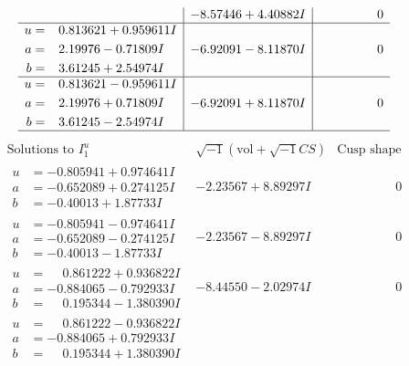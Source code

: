 \documentclass[1p]{elsarticle_modified}
\theoremstyle{definition}
\newcommand{\I}{\sqrt{-1}}
\begin{document}
$$\begin{array}{c|c|c}
 & -8.57446 + 4.40882 I & \phantom{-0.000000 } 0 \\ \hline\begin{aligned}
u &= \phantom{-}0.813621 + 0.959611 I \\
a &= \phantom{-}2.19976 - 0.71809 I \\
b &= \phantom{-}3.61245 + 2.54974 I\end{aligned}
 & -6.92091 - 8.11870 I & \phantom{-0.000000 } 0 \\ \hline\begin{aligned}
u &= \phantom{-}0.813621 - 0.959611 I \\
a &= \phantom{-}2.19976 + 0.71809 I \\
b &= \phantom{-}3.61245 - 2.54974 I\end{aligned}
 & -6.92091 + 8.11870 I & \phantom{-0.000000 } 0\\
 \hline 
 \end{array}$$\newpage$$\begin{array}{c|c|c}  
\text{Solutions to }I^u_{1}& \I (\text{vol} + \sqrt{-1}CS) & \text{Cusp shape}\\
 \hline 
\begin{aligned}
u &= -0.805941 + 0.974641 I \\
a &= -0.652089 + 0.274125 I \\
b &= -0.40013 + 1.87733 I\end{aligned}
 & -2.23567 + 8.89297 I & \phantom{-0.000000 } 0 \\ \hline\begin{aligned}
u &= -0.805941 - 0.974641 I \\
a &= -0.652089 - 0.274125 I \\
b &= -0.40013 - 1.87733 I\end{aligned}
 & -2.23567 - 8.89297 I & \phantom{-0.000000 } 0 \\ \hline\begin{aligned}
u &= \phantom{-}0.861222 + 0.936822 I \\
a &= -0.884065 - 0.792933 I \\
b &= \phantom{-}0.195344 - 1.380390 I\end{aligned}
 & -8.44550 - 2.02974 I & \phantom{-0.000000 } 0 \\ \hline\begin{aligned}
u &= \phantom{-}0.861222 - 0.936822 I \\
a &= -0.884065 + 0.792933 I \\
b &= \phantom{-}0.195344 + 1.380390 I\end{aligned}

\end{array}$$
\end{document}
